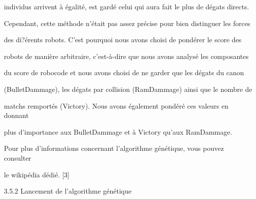 \documentclass[a4paper,portrait,12pt]{article}
\begin{document}
\begin{flushleft}
individus arrivent \`{a} \'{e}galit\'{e}, est gard\'{e} celui qui aura fait le plus de d\'{e}gats directs.
\end{flushleft}


\begin{flushleft}
Cependant, cette m\'{e}thode n'\'{e}tait pas assez pr\'{e}cise pour bien distinguer les forces
\end{flushleft}


\begin{flushleft}
des di?\'{e}rents robots. C'est pourquoi nous avons choisi de pond\'{e}rer le score des
\end{flushleft}


\begin{flushleft}
robots de mani\`{e}re arbitraire, c'est-\`{a}-dire que nous avons analys\'{e} les composantes
\end{flushleft}


\begin{flushleft}
du score de robocode et nous avons choisi de ne garder que les d\'{e}gats du canon
\end{flushleft}


\begin{flushleft}
(BulletDammage), les d\'{e}gats par collision (RamDammage) ainsi que le nombre de
\end{flushleft}


\begin{flushleft}
matchs remport\'{e}s (Victory). Nous avons \'{e}galement pond\'{e}r\'{e} ces valeurs en donnant
\end{flushleft}


\begin{flushleft}
plus d'importance aux BulletDammage et \`{a} Victory qu'aux RamDammage.
\end{flushleft}


\begin{flushleft}
Pour plus d'informations concernant l'algorithme g\'{e}n\'{e}tique, vous pouvez consulter
\end{flushleft}


\begin{flushleft}
le wikip\'{e}dia d\'{e}di\'{e}. [3]
\end{flushleft}





\begin{flushleft}
3.5.2 Lancement de l'algorithme g\'{e}n\'{e}tique
\end{flushleft}
\end{document}
